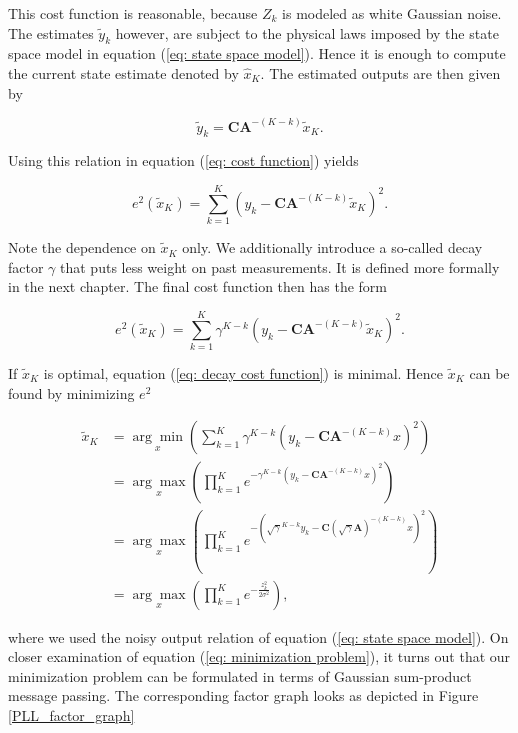 \documentclass[11pt,a4paper,twoside]{report}
\newcommand{\mat}[1]{\mathbf{#1}}
\begin{document}
This cost function is reasonable, because $Z_k$ is modeled as white Gaussian noise. The estimates $\tilde{y}_k$ however, are subject to the physical laws imposed by the state space model in equation (\ref{eq: state space model}). Hence it is enough to compute the current state estimate denoted by $\hat{x}_K$. The estimated outputs are then given by

\begin{equation}
	\tilde{y}_k = \mat{C}\mat{A}^{-(K-k)} \tilde{x}_K.
\end{equation}

\noindent Using this relation in equation (\ref{eq: cost function}) yields

\begin{equation*}
	e^2\left( \tilde{x}_K \right) = \sum_{k=1}^K \left(y_k - \mat{C}\mat{A}^{-(K-k)} \tilde{x}_K\right)^2.
\end{equation*}

Note the dependence on $\tilde{x}_K$ only. We additionally introduce a so-called decay factor $\gamma$ that puts less weight on past measurements. It is defined more formally in the next chapter. The final cost function then has the form

\begin{equation}
	\label{eq: decay cost function}
	e^2\left( \tilde{x}_K \right) = \sum_{k=1}^K  \gamma^{K-k} \left(y_k - \mat{C}\mat{A}^{-(K-k)} \tilde{x}_K\right)^2.
\end{equation}

If $\tilde{x}_K$ is optimal, equation (\ref{eq: decay cost function}) is minimal. Hence $\tilde{x}_K$ can be found by minimizing $e^2$

\begin{align}
	\nonumber
	\tilde{x}_K &= \underset{x}{\arg\min} \left( \sum_{k=1}^K  \gamma^{K-k} \left(y_k - \mat{C}\mat{A}^{-(K-k)} x\right)^2 \right)\\
	\nonumber
	&= \underset{x}{\arg\max} \left( \prod_{k=1}^K  e^{-\gamma^{K-k} \left(y_k - \mat{C}\mat{A}^{-(K-k)} x\right)^2} \right)\\
	\nonumber
	&= \underset{x}{\arg\max} \left( \prod_{k=1}^K  e^{- \left(\sqrt{\gamma}^{K-k} y_k - \mat{C} \left(\sqrt{\gamma}\mat{A}\right)^{-(K-k)} x\right)^2} \right)\\
	\label{eq: minimization problem}
	&= \underset{x}{\arg\max} \left( \prod_{k=1}^K  e^{- \frac{z_k^2}{2\sigma^2}} \right),
\end{align}

\noindent where we used the noisy output relation of equation (\ref{eq: state space model}). On closer examination of equation (\ref{eq: minimization problem}), it turns out that our minimization problem can be formulated in terms of Gaussian sum-product message passing. The corresponding factor graph looks as depicted in Figure \ref{PLL_factor_graph}
\end{document}
